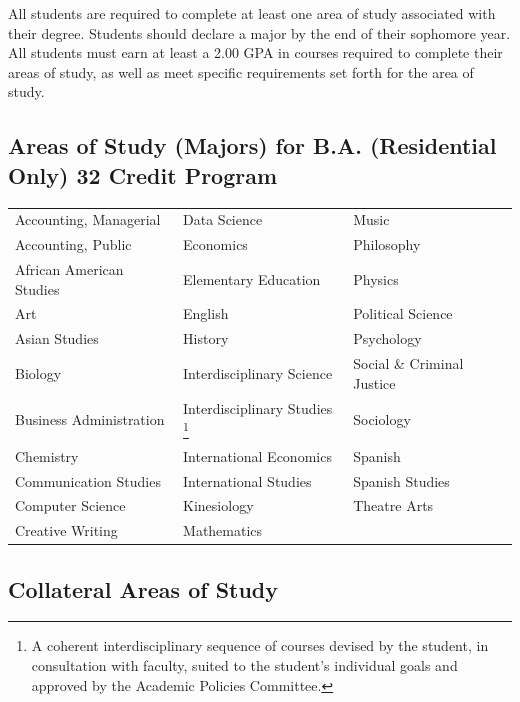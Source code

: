 \documentclass[
  letterpaper,
]{scrbook}
\renewcommand\toprule[2]\relax
\renewcommand\bottomrule[2]\relax
\newcounter{none}
\begin{document}
All students are required to complete at least one area of study
associated with their degree. Students should declare a major by the end
of their sophomore year. All students must earn at least a 2.00 GPA in
courses required to complete their areas of study, as well as meet
specific requirements set forth for the area of study.

\subsection{Areas of Study (Majors) for B.A. (Residential Only) 32
Credit
Program}\label{areas-of-study-majors-for-b.a.-residential-only-32-credit-program}

{\def\LTcaptype{none} %
\begin{longtable}[]{@{}
  >{\raggedright\arraybackslash}p{}
  >{\raggedright\arraybackslash}p{}
  >{\raggedright\arraybackslash}p{}@{}}
\toprule\noalign{}
\endhead
\bottomrule\noalign{}
\endlastfoot
Accounting, Managerial & Data Science & Music \\
Accounting, Public & Economics & Philosophy \\
African American Studies & Elementary Education & Physics \\
Art & English & Political Science \\
Asian Studies & History & Psychology \\
Biology & Interdisciplinary Science & Social \& Criminal Justice \\
Business Administration & Interdisciplinary Studies \footnote{A coherent
  interdisciplinary sequence of courses devised by the student, in
  consultation with faculty, suited to the student's individual goals
  and approved by the Academic Policies Committee.} & Sociology \\
Chemistry & International Economics & Spanish \\
Communication Studies & International Studies & Spanish Studies \\
Computer Science & Kinesiology & Theatre Arts \\
Creative Writing & Mathematics & \\
\end{longtable}
}

\subsection{Collateral Areas of Study}\label{collateral-areas-of-study}
\end{document}

